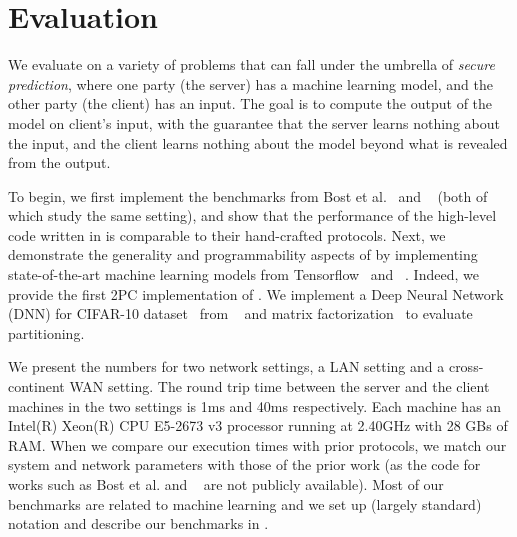 \section{Evaluation}
\label{sec:eval}
We evaluate \tool on a variety of problems that can fall under the umbrella of {\it secure prediction}, where one
party (the server) has a machine learning model, and the other party
(the client) has an input. The goal is to compute the output of the
model on client's input, with the guarantee that the server
learns nothing about the input, and the client learns nothing
about the model beyond what is revealed from the output.

To begin, we first implement the benchmarks from Bost et al.~\cite{shafindss}
and \minion~\cite{minionn} (both of which study the same setting),
and show that the performance of the high-level code written in \tool
is comparable to their hand-crafted protocols.
%
Next, we demonstrate the generality and programmability aspects of
\tool by implementing state-of-the-art machine learning models from
Tensorflow~\cite{tensorflow} and \bonsai~\cite{bonsai}. Indeed, we
provide the first 2PC implementation of \bonsai.
%
We
implement a Deep Neural Network (DNN) for CIFAR-10
dataset~\cite{cifar} from \minion~\cite{minionn} and matrix factorization~\cite{valeriaMatrix}
to evaluate partitioning.

We present the numbers for two network settings, a LAN setting and
a cross-continent WAN setting. The round trip time between the server
and the client machines in the two settings is 1ms and 40ms respectively. Each
machine has an Intel(R) Xeon(R) CPU E5-2673 v3 processor running at
2.40GHz with 28 GBs of RAM. When we compare our execution times with prior protocols, we match our system and network parameters with those of the prior work (as the code for works such as Bost et al. \cite{shafindss} and \minion~\cite{minionn} are not publicly available).
%
Most of our benchmarks
are related to machine learning and we set up (largely standard) notation and describe our benchmarks in .

